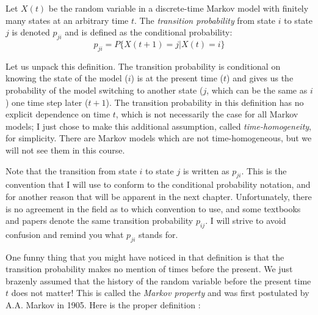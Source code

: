 \documentclass[
  letterpaper,
  DIV=11,
  numbers=noendperiod]{scrreprt}
\begin{document}
\begin{tcolorbox}[enhanced jigsaw, arc=.35mm, colframe=quarto-callout-note-color-frame, left=2mm, opacitybacktitle=0.6, breakable, title=\textcolor{quarto-callout-note-color}{\faInfo}\hspace{0.5em}{Definition}, toprule=.15mm, coltitle=black, bottomtitle=1mm, toptitle=1mm, colback=white, leftrule=.75mm, colbacktitle=quarto-callout-note-color!10!white, titlerule=0mm, opacityback=0, rightrule=.15mm, bottomrule=.15mm]

Let \(X(t)\) be the random variable in a discrete-time Markov model with
finitely many states at an arbitrary time \(t\). The \emph{transition
probability} from state \(i\) to state \(j\) is denoted \(p_{ji}\) and
is defined as the conditional probability:
\[ p_{ji} = P \{X(t+1) = j | X(t) = i \}\]

\end{tcolorbox}

Let us unpack this definition. The transition probability is conditional
on knowing the state of the model (\(i\)) is at the present time (\(t\))
and gives us the probability of the model switching to another state
(\(j\), which can be the same as \(i\)) one time step later (\(t+1\)).
The transition probability in this definition has no explicit dependence
on time \(t\), which is not necessarily the case for all Markov models;
I just chose to make this additional assumption, called
\emph{time-homogeneity}, for simplicity. There are Markov models which
are not time-homogeneous, but we will not see them in this course.

Note that the transition from state \(i\) to state \(j\) is written as
\(p_{ji}\). This is the convention that I will use to conform to the
conditional probability notation, and for another reason that will be
apparent in the next chapter. Unfortunately, there is no agreement in
the field as to which convention to use, and some textbooks and papers
denote the same transition probability \(p_{ij}\). I will strive to
avoid confusion and remind you what \(p_{ji}\) stands for.

One funny thing that you might have noticed in that definition is that
the transition probability makes no mention of times before the present.
We just brazenly assumed that the history of the random variable before
the present time \(t\) does not matter! This is called the \emph{Markov
property} and was first postulated by A.A. Markov in 1905. Here is the
proper definition \cite{feller_introduction_????}:
\end{document}
